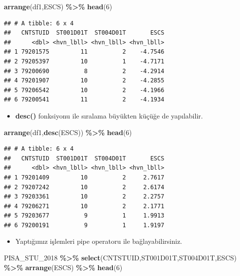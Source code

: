 \documentclass[
  oneside]{book}
\newenvironment{Shaded}{\begin{snugshade}}{\end{snugshade}}
\newcommand{\DecValTok}[1]{\textcolor[rgb]{0.00,0.00,0.81}{#1}}
\newcommand{\FunctionTok}[1]{\textcolor[rgb]{0.13,0.29,0.53}{\textbf{#1}}}
\newcommand{\NormalTok}[1]{#1}
\newcommand{\SpecialCharTok}[1]{\textcolor[rgb]{0.81,0.36,0.00}{\textbf{#1}}}
\providecommand{\tightlist}{%
  \setlength{\itemsep}{0pt}\setlength{\parskip}{0pt}}
\begin{document}
\begin{Shaded}
\begin{Highlighting}[]
\FunctionTok{arrange}\NormalTok{(df1,ESCS) }\SpecialCharTok{\%\textgreater{}\%} \FunctionTok{head}\NormalTok{(}\DecValTok{6}\NormalTok{)}
\end{Highlighting}
\end{Shaded}

\begin{verbatim}
## # A tibble: 6 x 4
##   CNTSTUID  ST001D01T  ST004D01T       ESCS
##      <dbl> <hvn_lbll> <hvn_lbll> <hvn_lbll>
## 1 79201575         11          2    -4.7546
## 2 79205397         10          1    -4.7171
## 3 79200690          8          2    -4.2914
## 4 79201907         10          2    -4.2855
## 5 79206542         10          2    -4.1966
## 6 79200541         11          2    -4.1934
\end{verbatim}

\begin{itemize}
\tightlist
\item
  \textbf{desc()} fonksiyonu ile sıralama büyükten küçüğe de yapılabilir.
\end{itemize}

\begin{Shaded}
\begin{Highlighting}[]
\FunctionTok{arrange}\NormalTok{(df1,}\FunctionTok{desc}\NormalTok{(ESCS)) }\SpecialCharTok{\%\textgreater{}\%} \FunctionTok{head}\NormalTok{(}\DecValTok{6}\NormalTok{)}
\end{Highlighting}
\end{Shaded}

\begin{verbatim}
## # A tibble: 6 x 4
##   CNTSTUID  ST001D01T  ST004D01T       ESCS
##      <dbl> <hvn_lbll> <hvn_lbll> <hvn_lbll>
## 1 79201409         10          2     2.7617
## 2 79207242         10          2     2.6174
## 3 79203361         10          2     2.2757
## 4 79206271         10          2     2.1771
## 5 79203677          9          1     1.9913
## 6 79200191          9          1     1.9197
\end{verbatim}

\begin{itemize}
\tightlist
\item
  Yaptığımız işlemleri pipe operatoru ile bağlayabilirsiniz.
\end{itemize}

\begin{Shaded}
\begin{Highlighting}[]
\NormalTok{PISA\_STU\_2018 }\SpecialCharTok{\%\textgreater{}\%}
  \FunctionTok{select}\NormalTok{(CNTSTUID,ST001D01T,ST004D01T,ESCS) }\SpecialCharTok{\%\textgreater{}\%}
  \FunctionTok{arrange}\NormalTok{(ESCS) }\SpecialCharTok{\%\textgreater{}\%}
  \FunctionTok{head}\NormalTok{(}\DecValTok{6}\NormalTok{)}
\end{Highlighting}
\end{Shaded}
\end{document}
